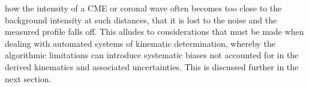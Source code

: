 \documentclass[structabstract]{aa}
\begin{document}
how the intensity of a CME or coronal wave often becomes too close to the background intensity at such distances, that it is lost to the noise and the measured profile falls off. This alludes to considerations that must be made when dealing with automated systems of kinematic determination, whereby the algorithmic limitations can introduce systematic biases not accounted for in the derived kinematics and associated uncertainties. This is discussed further in the next section.


\begin{figure}[t]
\centering
{}

\end{figure}
\end{document}
